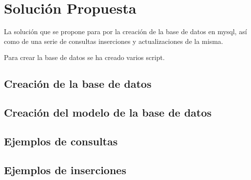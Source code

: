 \documentclass[a4paper]{article}
\begin{document}
	\section{Solución Propuesta}\label{solucion}
	La solución que se propone para por la creación de la base de datos en mysql, así como de una serie de consultas inserciones y actualizaciones de la misma.
	
	Para crear la base de datos se ha creado varios script.
	\subsection{Creación de la base de datos}
	
	\subsection{Creación del modelo de la base de datos}
	
	
	\subsection{Ejemplos de consultas}
	
	
	\subsection{Ejemplos de inserciones}
	
% 	
% 	
% 	
% 	
% 	
% 	
% 	
% 	
% 	
\end{document}
